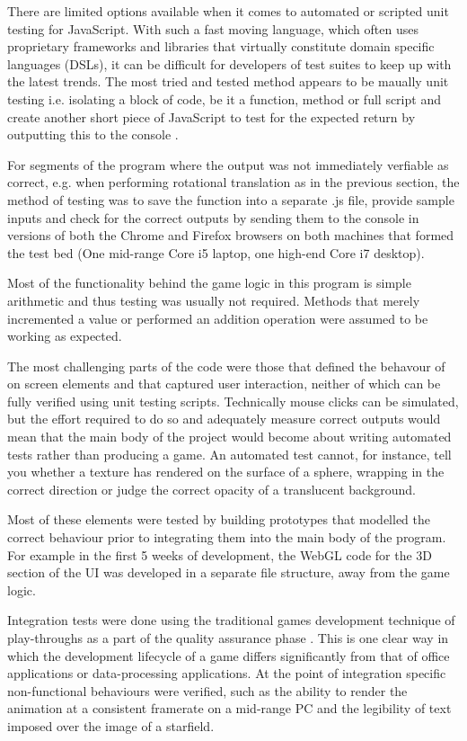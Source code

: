 \documentclass[twoside]{bhamthesis}
\begin{document}
There are limited options available when it comes to automated or scripted unit testing for JavaScript. With such a fast moving language, which often uses proprietary frameworks and libraries that virtually constitute domain specific languages (DSLs), it can be difficult for developers of test suites to keep up with the latest trends.
The most tried and tested method appears to be maually unit testing i.e. isolating a block of code, be it a function, method or full script and create another short piece of JavaScript to test for the expected return by outputting this to the console \cite{zaefferer_introduction_2012}.

For segments of the program where the output was not immediately verfiable as correct, e.g. when performing rotational translation as in the previous section, the method of testing was to save the function into a separate .js file, provide sample inputs and check for the correct outputs by sending them to the console in versions of both the Chrome and Firefox browsers on both machines that formed the test bed (One mid-range Core i5 laptop, one high-end Core i7 desktop).

Most of the functionality behind the game logic in this program is simple arithmetic and thus testing was usually not required. Methods that merely incremented a value or performed an addition operation were assumed to be working as expected.

The most challenging parts of the code were those that defined the behavour of on screen elements and that captured user interaction, neither of which can be fully verified using unit testing scripts. Technically mouse clicks can be simulated, but the effort required to do so and adequately measure correct outputs would mean that the main body of the project would become about writing automated tests rather than producing a game. An automated test cannot, for instance, tell you whether a texture has rendered on the surface of a sphere, wrapping in the correct direction or judge the correct opacity of a translucent background.

Most of these elements were tested by building prototypes that modelled the correct behaviour prior to integrating them into the main body of the program. For example in the first 5 weeks of development, the WebGL code for the 3D section of the UI was developed in a separate file structure, away from the game logic.

Integration tests were done using the traditional games development technique of play-throughs as a part of the quality assurance phase \cite{chandler_game_2009}. This is one clear way in which the development lifecycle of a game differs significantly from that of office applications or data-processing applications. At the point of integration specific non-functional behaviours were verified, such as the ability to render the animation at a consistent framerate on a mid-range PC and the legibility of text imposed over the image of a starfield.
\end{document}
